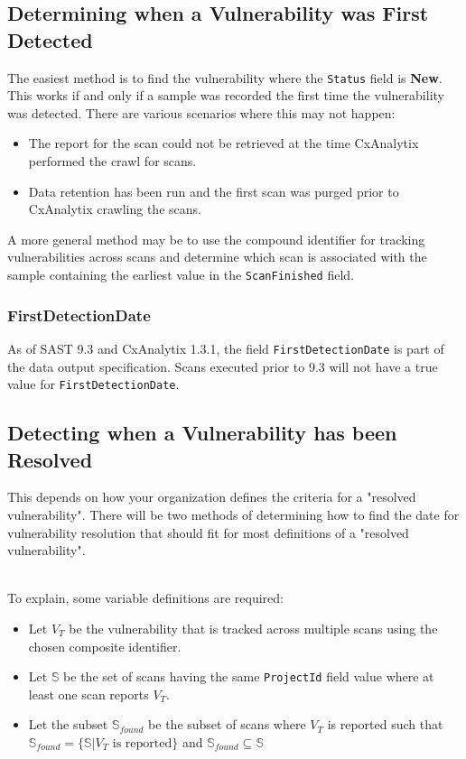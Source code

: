 \subsection{Determining when a Vulnerability was First Detected}

The easiest method is to find the vulnerability where the \texttt{Status} field is \textbf{New}.  This works if and 
only if a sample was recorded the first time the vulnerability was detected.  There are various scenarios where this may not happen:

\begin{itemize}
    \item The report for the scan could not be retrieved at the time CxAnalytix performed the crawl for scans.
    \item Data retention has been run and the first scan was purged prior to CxAnalytix crawling the scans.
\end{itemize}

A more general method may be to use the compound identifier for tracking vulnerabilities across scans and determine which scan is associated with the 
sample containing the earliest value in the \texttt{ScanFinished} field.

\subsubsection{FirstDetectionDate}

As of SAST 9.3 and CxAnalytix 1.3.1, the field \texttt{FirstDetectionDate} is part of the data output specification.  Scans executed prior to 9.3 will not have a true
value for \texttt{FirstDetectionDate}.  


\subsection{Detecting when a Vulnerability has been Resolved}

This depends on how your organization defines the criteria for a "resolved vulnerability".  There will be two methods of determining how to find the date
for vulnerability resolution that should fit for most definitions of a "resolved vulnerability".


\noindent\\To explain, some variable definitions are required:\\
\begin{itemize}
    \item Let $V_T$ be the vulnerability that is tracked across multiple scans using the chosen composite identifier.
    \item Let $\mathbb{S}$ be the set of scans having the same \texttt{ProjectId} field value where at least one scan reports $V_T$.
    \item Let the subset $\mathbb{S}_{found}$ be the subset of scans where $V_T$ is reported
    such that $\mathbb{S}_{found} = \{\mathbb{S} | V_T \text{ is reported}\}$ and $\mathbb{S}_{found}\subseteq\mathbb{S}$
\end{itemize}

